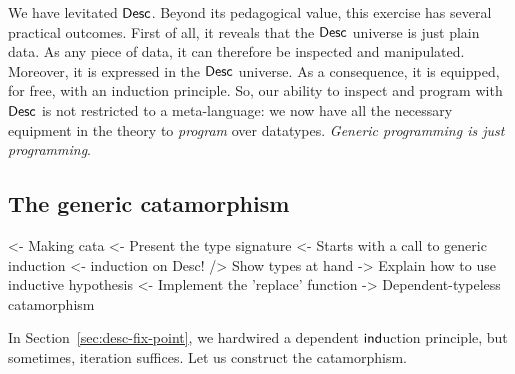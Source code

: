 We have levitated \(\Desc\). Beyond its pedagogical value, this
exercise has several practical outcomes. First of all, it reveals that
the $\Desc$ universe is just plain data. As any piece of data, it can
therefore be inspected and manipulated. Moreover, it is expressed in
the $\Desc$ universe. As a consequence, it is equipped, for free, with
an induction principle. So, our ability to inspect and program with
$\Desc$ is not restricted to a meta-language: we now have all the
necessary equipment in the theory to \emph{program} over
datatypes. \emph{Generic programming is just
  programming}.


\subsection{The generic catamorphism}

\begin{wstructure}
<- Making cata
    <- Present the type signature
    <- Starts with a call to generic induction
        <- induction on Desc!
        /> Show types at hand
        -> Explain how to use inductive hypothesis
    <- Implement the 'replace' function
    -> Dependent-typeless catamorphism 
\end{wstructure}

In Section~\ref{sec:desc-fix-point}, we hardwired a dependent
$\F{ind}$uction principle, but sometimes,
iteration suffices. Let us construct the catamorphism.

\newcommand{\cata}{\F{cata}}

